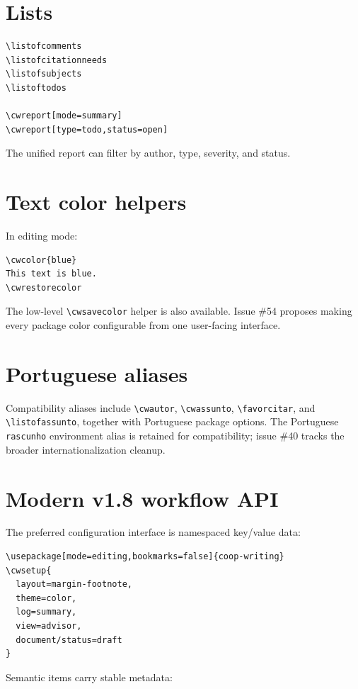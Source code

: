 \documentclass[11pt]{article}
\newcommand{\cmd}[1]{\texttt{\textbackslash#1}}
\begin{document}
\section*{Lists}

\begin{verbatim}
\listofcomments
\listofcitationneeds
\listofsubjects
\listoftodos

\cwreport[mode=summary]
\cwreport[type=todo,status=open]
\end{verbatim}

The unified report can filter by author, type, severity, and status.

\section*{Text color helpers}

In editing mode:

\begin{verbatim}
\cwcolor{blue}
This text is blue.
\cwrestorecolor
\end{verbatim}

The low-level \cmd{cwsavecolor} helper is also available. Issue \#54 proposes making every package color configurable from one user-facing interface.

\section*{Portuguese aliases}

Compatibility aliases include \cmd{cwautor}, \cmd{cwassunto}, \cmd{favorcitar}, and \cmd{listofassunto}, together with Portuguese package options. The Portuguese \texttt{rascunho} environment alias is retained for compatibility; issue \#40 tracks the broader internationalization cleanup.

\section*{Modern v1.8 workflow API}

The preferred configuration interface is namespaced key/value data:

\begin{verbatim}
\usepackage[mode=editing,bookmarks=false]{coop-writing}
\cwsetup{
  layout=margin-footnote,
  theme=color,
  log=summary,
  view=advisor,
  document/status=draft
}
\end{verbatim}

Semantic items carry stable metadata:
\end{document}
